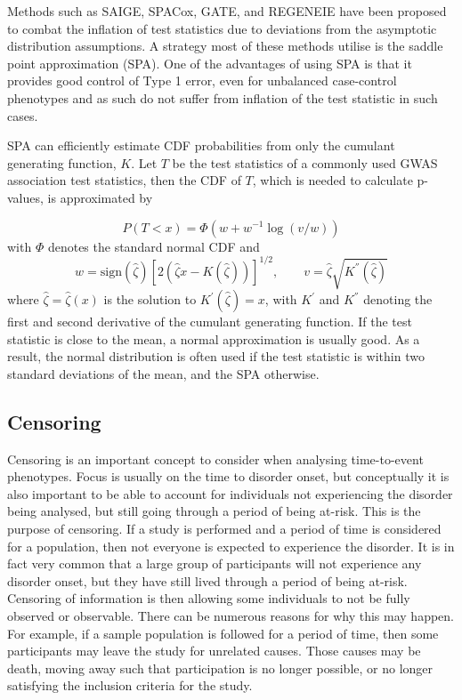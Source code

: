 Methods such as SAIGE\cite{zhou2018efficiently}, SPACox\cite{bi2020fast}, GATE\cite{dey2022efficient}, and REGENEIE\cite{mbatchou2021computationally} have been proposed to combat the inflation of test statistics due to deviations from the asymptotic distribution assumptions. A strategy most of these methods utilise is the saddle point approximation (SPA)\cite{daniels1954saddlepoint,kuonen1999miscellanea}. One of the advantages of using SPA is that it provides good control of Type 1 error, even for unbalanced case-control phenotypes and as such do not suffer from inflation of the test statistic in such cases\cite{mbatchou2021computationally}.

SPA can efficiently estimate CDF probabilities from only the cumulant generating function, $ K $. Let $ T $ be the test statistics of a commonly used GWAS association test statistics, then the CDF of $ T $, which is needed to calculate p-values, is approximated by

\begin{equation}
P(T < x) = \Phi\left( w + w^{-1} \log(v/w)\right)
\end{equation}
with $ \Phi $ denotes the standard normal CDF and
\begin{equation}
w = \text{sign}(\hat{\zeta})\left[2\left(\hat{\zeta} x - K(\hat{\zeta})\right) \right]^{1/2},
 \qquad 
v = \hat{\zeta}\sqrt{K^{''}(\hat{\zeta})}
\end{equation}
where $ \hat{\zeta} = \hat{\zeta}(x) $ is the solution to $ K^{'}(\hat{\zeta}) = x $, with $ K^{'} $ and $ K^{''} $ denoting the first and second derivative of the cumulant generating function. If the test statistic is close to the mean, a normal approximation is usually good. As a result, the normal distribution is often used if the test statistic is within two standard deviations of the mean, and the SPA otherwise.

\subsection{Censoring}

Censoring is an important concept to consider when analysing time-to-event phenotypes. Focus is usually on the time to disorder onset, but conceptually it is also important to be able to account for individuals not experiencing the disorder being analysed, but still going through a period of being at-risk. This is the purpose of censoring. If a study is performed and a period of time is considered for a population, then not everyone is expected to experience the disorder. It is in fact very common that a large group of participants will not experience any disorder onset, but they have still lived through a period of being at-risk. Censoring of information is then allowing some individuals to not be fully observed or observable. There can be numerous reasons for why this may happen. For example, if a sample population is followed for a period of time, then some participants may leave the study for unrelated causes. Those causes may be death, moving away such that participation is no longer possible, or no longer satisfying the inclusion criteria for the study. 

